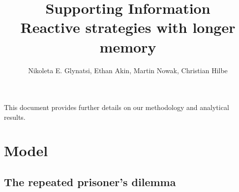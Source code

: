 \documentclass[11pt]{article}
\title{{\sffamily \LARGE Supporting Information}\\ {\bfseries \sffamily \LARGE Reactive strategies with longer memory}\\[-0.3cm]}
\author{Nikoleta E. Glynatsi, Ethan Akin, Martin Nowak, Christian Hilbe}
\date{\empty}
\theoremstyle{definition}
\begin{document}
\maketitle


\noindent
This document provides further details on our methodology and analytical
results. 
\begin{comment}
Section~\ref{section:model} summarizes the model. In particular, we
provide further details on how we approximate the play of players using
different strategies and how we calculate long-term payoffs for strategies with
memory higher than $1$. In Section~\ref{section:tft_and_gtft}, we analytically
show that well-known strategies like Tit For Tat and Generous Tit For Tat, of
all memory lengths, as well as their delayed versions, are partner strategies.
In Section~\ref{section:self_reactive_sufficiency}, we derive the analytical
result that when facing a player with a reactive$-n$ strategy, the play of
memory$-n$ strategy can be approximated by a self-reactive-$n$ strategy. In the
next section (Section~\ref{section:algorithm_for_nash}), we present an immediate
application of this result, resulting in an efficient way to identify Nash
equilibria in reactive strategies. In Section~\ref{section:reactive_strategies},
we present all the results discussed in the main paper. Specifically, we
characterize partner strategies among reactive-$n$ strategies. In
subsection~\ref{section:general_prisoners_dilemma}, we demonstrate how our
findings extend to the general Prisoner's Dilemma. The proofs of the results in
this section are presented in the Appendices.
\end{comment}



\section{Model}\label{section:model}

\subsection{The repeated prisoner's dilemma}
\end{document}
